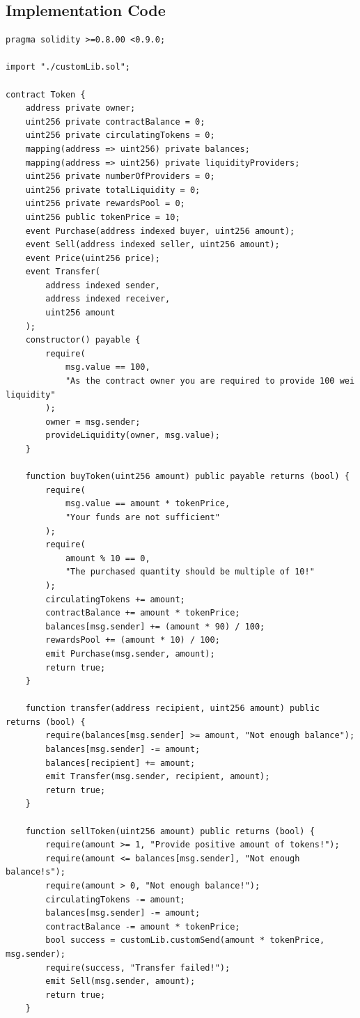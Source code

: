 \documentclass[12pt,a4paper]{article}
\begin{document}
\subsection*{Implementation Code}
\begin{lstlisting}
pragma solidity >=0.8.00 <0.9.0;

import "./customLib.sol";

contract Token {
    address private owner;
    uint256 private contractBalance = 0;
    uint256 private circulatingTokens = 0;
    mapping(address => uint256) private balances;
    mapping(address => uint256) private liquidityProviders;
    uint256 private numberOfProviders = 0;
    uint256 private totalLiquidity = 0;
    uint256 private rewardsPool = 0;
    uint256 public tokenPrice = 10;
    event Purchase(address indexed buyer, uint256 amount);
    event Sell(address indexed seller, uint256 amount);
    event Price(uint256 price);
    event Transfer(
        address indexed sender,
        address indexed receiver,
        uint256 amount
    );
    constructor() payable {
        require(
            msg.value == 100,
            "As the contract owner you are required to provide 100 wei liquidity"
        );
        owner = msg.sender;
        provideLiquidity(owner, msg.value);
    }

    function buyToken(uint256 amount) public payable returns (bool) {
        require(
            msg.value == amount * tokenPrice,
            "Your funds are not sufficient"
        );
        require(
            amount % 10 == 0,
            "The purchased quantity should be multiple of 10!"
        );
        circulatingTokens += amount;
        contractBalance += amount * tokenPrice;
        balances[msg.sender] += (amount * 90) / 100;
        rewardsPool += (amount * 10) / 100;
        emit Purchase(msg.sender, amount);
        return true;
    }

    function transfer(address recipient, uint256 amount) public returns (bool) {
        require(balances[msg.sender] >= amount, "Not enough balance");
        balances[msg.sender] -= amount;
        balances[recipient] += amount;
        emit Transfer(msg.sender, recipient, amount);
        return true;
    }

    function sellToken(uint256 amount) public returns (bool) {
        require(amount >= 1, "Provide positive amount of tokens!");
        require(amount <= balances[msg.sender], "Not enough balance!s");
        require(amount > 0, "Not enough balance!");
        circulatingTokens -= amount;
        balances[msg.sender] -= amount;
        contractBalance -= amount * tokenPrice;
        bool success = customLib.customSend(amount * tokenPrice, msg.sender);
        require(success, "Transfer failed!");
        emit Sell(msg.sender, amount);
        return true;
    }


\end{lstlisting}
\end{document}
